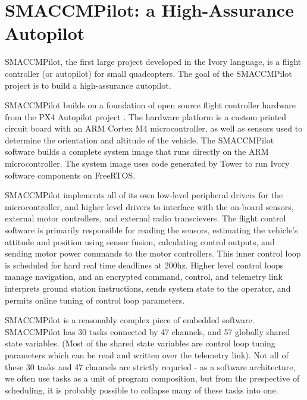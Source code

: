 \section{SMACCMPilot: a High-Assurance Autopilot}

SMACCMPilot, the first large project developed in the Ivory language, is a
flight controller (or autopilot) for small quadcopters. The goal of the
SMACCMPilot project is to build a high-assurance autopilot.

SMACCMPilot builds on a foundation of open source flight controller hardware
from the PX4 Autopilot project . The hardware platform is a
custom printed circuit board with an ARM Cortex M4 microcontroller, as well as
sensors used to determine the orientation and altitude of the vehicle.
 The
SMACCMPilot software builds a complete system image that runs directly on the
ARM microcontroller. The system image uses code generated by Tower to run Ivory
software components on FreeRTOS.

SMACCMPilot implements all of its own low-level peripheral drivers for the
microcontroller, and higher level drivers to interface with the on-board
sensors, external motor controllers, and external radio transcievers. The flight
control software is primarily responsible for reading the sensors, estimating
the vehicle's attitude and position using sensor fusion, calculating control
outputs, and sending motor power commands to the motor controllers. This inner
control loop is scheduled for hard real time deadlines at 200hz. Higher level
control loops manage navigation, and an encrypted command, control, and
telemetry link interprets ground station instructions, sends system state to
the operator, and permits online tuning of control loop parameters.

SMACCMPilot is a reasonably complex piece of embedded software.  SMACCMPilot has
30 tasks connected by 47 channels, and 57 globally shared state variables. (Most
of the shared state variables are control loop tuning parameters which can be
read and written over the telemetry link). Not all of these 30 tasks and 47
channels are strictly requried - as a software architecture, we often use tasks
as a unit of program composition, but from the prespective of scheduling, it is
probably possible to collapse many of these tasks into one.


